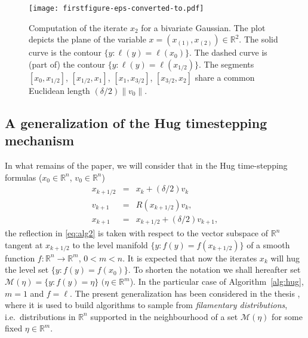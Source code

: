 \documentclass[10pt]{article}
\newcommand{\bbR}{\mathbb R}
\begin{document}
\begin{figure}[t]
	\centering
	\texttt{[image: firstfigure-eps-converted-to.pdf]}
	\caption{Computation of the iterate \(x_2\) for a bivariate Gaussian. The plot depicts the plane of the variable \(x=(x_{(1)},x_{(2)})\in\bbR^2\). The solid curve is the contour  \(\{y :\ell(y) = \ell(x_0)\}\).  The dashed curve is (part of) the contour  \(\{y :\ell(y) = \ell(x_{1/2})\}\). The segments \([x_0,x_{1/2}]\), \([x_{1/2},x_{1}]\), \([x_1,x_{3/2}]\), \([x_{3/2},x_{2}]\)
share a common Euclidean length \((\delta/2)\|v_0\|\).}
	\label{fig:hug}
\end{figure}

\subsection{A generalization of the Hug timestepping mechanism} \label{subsec:generalHug}
In what remains of the paper, we will consider that in the Hug time-stepping formulas (\(x_0\in\bbR^n\), \(v_0\in\bbR^n\))
\begin{eqnarray}
x_{k+1/2} &=& x_k +(\delta/2) v_k\label{eq:alg1}\\
v_{k+1} &=& R(x_{k+1/2})v_k,\label{eq:alg2}\\
x_{k+1} &=& x_{k+1/2} +(\delta/2) v_{k+1},\label{eq:alg3}
\end{eqnarray}
the reflection in \eqref{eq:alg2} is taken with respect to  the vector subspace of \(\bbR^n\) tangent at \(x_{k+1/2}\) to the level manifold \(\{y:f(y)=f(x_{k+1/2})\}\) of a smooth function \(f:\bbR^n\rightarrow\bbR^m\), \(0<m<n\). It is expected that now the iterates
\(x_k\) will hug the level set \(\{y:f(y)=f(x_0)\}\). To shorten the notation we shall hereafter set \({\mathcal M}(\eta) = \{y:f(y)=\eta\}\)  \((\eta\in\bbR^m\)).
In the particular case of Algorithm~\ref{alg:hug}, \(m=1\) and
\(f=\ell\). The present generalization has been considered in the thesis \cite{C24}, where it is used to build algorithms to sample from \emph{filamentary distributions}, i.e.\ distributions in \(\bbR^n\) supported in the neighbourhood of a set \({\mathcal M}(\eta)\) for some fixed  \(\eta\in\bbR^m\).
\end{document}
